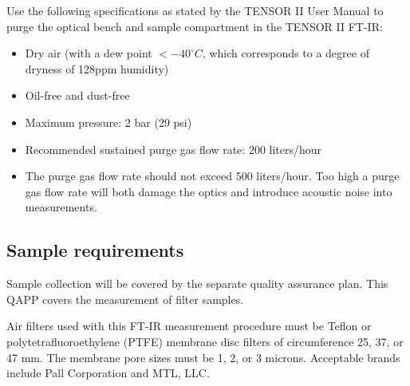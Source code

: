Use the following specifications as stated by the TENSOR II User Manual to purge the optical bench and sample compartment in the TENSOR II FT-IR\cite{Bruker1}:
\begin{itemize}
    \item Dry air (with a dew point $<-40^\circ C$, which corresponds to a degree of dryness of 128ppm humidity)
    \item Oil-free and dust-free
    \item Maximum pressure: 2 bar (29 psi)
    \item Recommended sustained purge gas flow rate: 200 liters/hour
    \item The purge gas flow rate should not exceed 500 liters/hour. Too high a purge gas flow rate will both damage the optics and introduce acoustic noise into measurements.
\end{itemize}

\subsection{Sample requirements}
Sample collection will be covered by the separate quality assurance plan. This QAPP covers the measurement of filter samples. 

Air filters used with this FT-IR measurement procedure must be Teflon or polytetrafluoroethylene (PTFE) membrane disc filters of circumference 25, 37, or 47 mm. The membrane pore sizes must be 1, 2, or 3 microns. Acceptable brands include Pall Corporation and MTL, LLC.